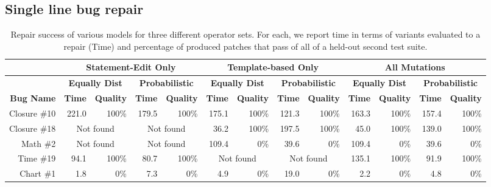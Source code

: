\documentclass[conference]{IEEEtran}
\begin{document}
\subsection{Single line bug repair}
\label{sec:single}

\begin{table}\centering
\begin{tabular}{r|rr|rr|rr|rr|rr|rr}
\hline
  &\multicolumn{4}{c|}{\textbf{Statement-Edit Only}} & \multicolumn{4}{c|}{\textbf{Template-based Only}} & \multicolumn{4}{c}{\textbf{All Mutations}} \\  
  \hline
  & \multicolumn{2}{c|}{\textbf{Equally Dist}} & \multicolumn{2}{c|}{\textbf{Probabilistic}} & \multicolumn{2}{c|}{\textbf{Equally Dist}} & \multicolumn{2}{c|}{\textbf{Probabilistic}} & \multicolumn{2}{c|}{\textbf{Equally Dist}} & 
\multicolumn{2}{c}{\textbf{Probabilistic}} \\

 \textbf{Bug Name} & \textbf{Time} & \textbf{Quality} &  \textbf{Time} & \textbf{Quality} &  \textbf{Time} & \textbf{Quality}&  \textbf{Time} & \textbf{Quality}&  \textbf{Time} & \textbf{Quality}&  \textbf{Time} & \textbf{Quality} \\
 \hline

 Closure \#10 & {221.0}& {100\%} & {179.5} &{100\%} & {175.1}&{100\%} & {121.3}&{100\%} & {163.3}&{100\%} & {157.4}&{100\%} \\

 Closure \#18 & \multicolumn{2}{c|}{Not found} & \multicolumn{2}{c|}{Not found} & {36.2}&{100\%} & {197.5}&{100\%} & {45.0}&{100\%} & {139.0}&{100\%} \\

 Math \#2 & \multicolumn{2}{c|}{Not found} & \multicolumn{2}{c|}{Not found} & {109.4}&{0\%} & {39.6}&{0\%} & {109.4}&{0\%} & {39.6}&{0\%} \\

 Time \#19 & {94.1}&{100\%} & {80.7}&{100\%} & \multicolumn{2}{c|}{Not found} & \multicolumn{2}{c|}{Not found} & {135.1}&{100\%} & {91.9}&{100\%} \\

 Chart \#1 & {1.8}&{0\%} & {7.3}&{0\%} & {4.9}&{0\%} & {19.0}&{0\%} & {2.2}&{0\%} & {4.8}&{0\%} \\
\hline

\end{tabular}
		\caption{Repair success of various models for three different operator
          sets.  For each, we report time in terms of variants evaluated to a
          repair (Time) and percentage of produced patches that pass of all of a
          held-out second test suite. \label{tab:singleLineBugs}}

\end{table}
\end{document}
